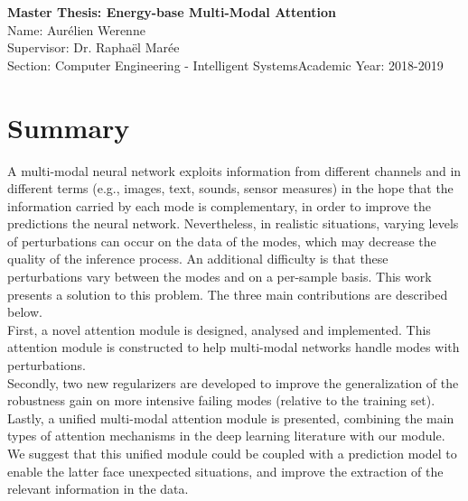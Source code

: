 \documentclass[a4paper, 12pt]{article}
\begin{document}
\noindent
\large\textbf{Master Thesis: Energy-base Multi-Modal Attention} \\
\normalsize Name: Aurélien Werenne \\
Supervisor: Dr. Raphaël Marée\\
Section: Computer Engineering - Intelligent Systems\hfill Academic Year: 2018-2019\\
 

\section*{Summary}
A multi-modal neural network exploits information from different channels and in different terms (e.g., images, text, sounds, sensor measures) in the hope that the information carried by each mode is complementary, in order to improve the predictions the neural network. Nevertheless, in realistic situations, varying levels of perturbations can occur on the data of the modes, which may decrease the quality of the inference process. An additional difficulty is that these perturbations vary between the modes and on a per-sample basis. This work presents a solution to this problem. The three main contributions are described below.\\

First, a novel attention module is designed, analysed and implemented. This attention module is constructed to help multi-modal networks handle modes with perturbations.\\

Secondly, two new regularizers are developed to improve the generalization of the robustness gain on more intensive failing modes (relative to the training set).\\

Lastly, a unified multi-modal attention module is presented, combining the main types of attention mechanisms in the deep learning literature with our module. We suggest that this unified module could be coupled with a prediction model to enable the latter face unexpected situations, and improve the extraction of the relevant information in the data.
\end{document}
